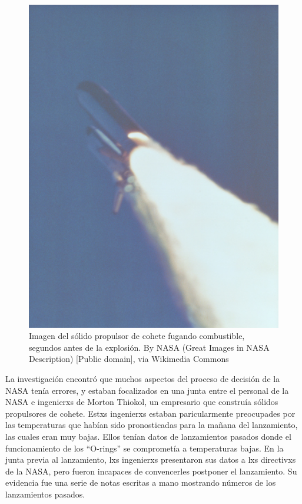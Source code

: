\documentclass[
  12pt,
]{book}
\theoremstyle{definition}
\theoremstyle{definition}
\theoremstyle{definition}
\theoremstyle{remark}
\begin{document}
\begin{figure}
\includegraphics[width=5in,height=0.2\textheight]{images/Booster_Rocket_Breach_-_GPN-2000-001425} \caption{Imagen del sólido propulsor de cohete fugando combustible, segundos antes de la explosión. By NASA (Great Images in NASA Description) [Public domain], via Wikimedia Commons}\label{fig:srbLeak}
\end{figure}

La investigación encontró que muchos aspectos del proceso de decisión de la NASA tenía errores, y estaban focalizados en una junta entre el personal de la NASA e ingenierxs de Morton Thiokol, un empresario que construía sólidos propulsores de cohete. Estxs ingenierxs estaban paricularmente preocupades por las temperaturas que habían sido pronosticadas para la mañana del lanzamiento, las cuales eran muy bajas. Ellos tenían datos de lanzamientos pasados donde el funcionamiento de los ``O-rings'' se comprometía a temperaturas bajas. En la junta previa al lanzamiento, lxs ingenierxs presentaron sus datos a lxs directivxs de la NASA, pero fueron incapaces de convencerles postponer el lanzamiento. Su evidencia fue una serie de notas escritas a mano mostrando números de los lanzamientos pasados.
\end{document}
